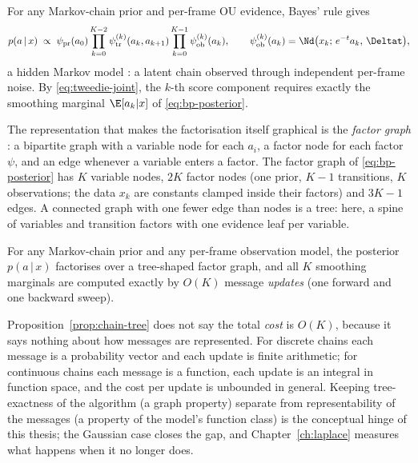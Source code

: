 For any Markov-chain prior and per-frame OU evidence, Bayes' rule gives
\begin{equation}
  p(a \,|\, x) \;\propto\;
  \psi_{\mathrm{pr}}(a_0)
  \prod_{k=0}^{K-2} \psi^{(k)}_{\mathrm{tr}}(a_k, a_{k+1})
  \prod_{k=0}^{K-1} \psi^{(k)}_{\mathrm{ob}}(a_k),
  \qquad
  \psi^{(k)}_{\mathrm{ob}}(a_k) = \Nd\big(x_k;\, e^{-t}a_k,\, \Deltat\big),
  \label{eq:bp-posterior}
\end{equation}
a hidden Markov model \citep{rabiner1989tutorial}: a latent chain observed
through independent per-frame noise. By \eqref{eq:tweedie-joint}, the
$k$-th score component requires exactly the smoothing marginal
$\E[a_k | x]$ of \eqref{eq:bp-posterior}.

The representation that makes the factorisation itself graphical is the
\emph{factor graph} \citep{kschischang2001factor, koller2009probabilistic}:
a bipartite graph with a variable node for each $a_i$, a factor node for
each factor $\psi$, and an edge whenever a variable enters a factor. The
factor graph of \eqref{eq:bp-posterior} has $K$ variable nodes, $2K$
factor nodes (one prior, $K{-}1$ transitions, $K$ observations; the data
$x_k$ are constants clamped inside their factors) and $3K - 1$ edges. A
connected graph with one fewer edge than nodes is a tree: here, a spine of
variables and transition factors with one evidence leaf per variable.

\begin{proposition}\label{prop:chain-tree}
For any Markov-chain prior and any per-frame observation model, the
posterior $p(a \,|\, x)$ factorises over a tree-shaped factor graph, and
all $K$ smoothing marginals are computed exactly by $O(K)$ message
\emph{updates} (one forward and one backward sweep).
\end{proposition}

Proposition~\ref{prop:chain-tree} does not say the total \emph{cost} is
$O(K)$, because it says nothing about how messages are represented. For
discrete chains each message is a probability vector and each update is
finite arithmetic; for continuous chains each message is a function, each
update is an integral in function space, and the cost per update is
unbounded in general. Keeping tree-exactness of the algorithm (a graph
property) separate from representability of the messages (a property of
the model's function class) is the conceptual hinge of this thesis; the
Gaussian case closes the gap, and Chapter~\ref{ch:laplace} measures what
happens when it no longer does.

